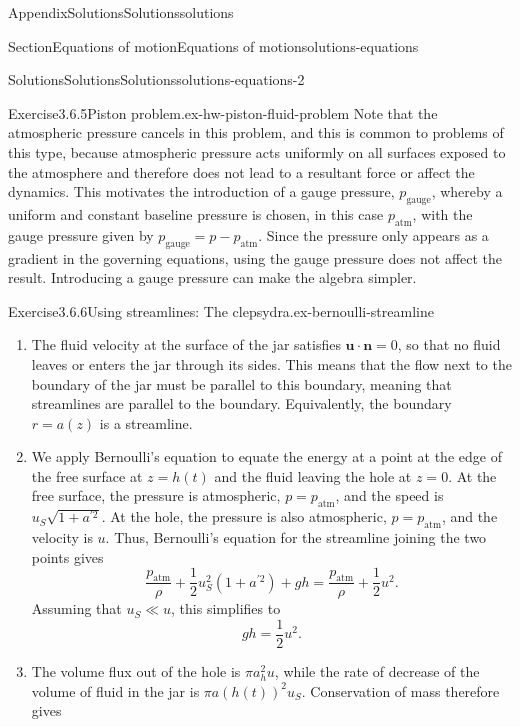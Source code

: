 \documentclass[oneside,10pt,]{book}
\numberwithin{equation}{section}
\newcommand{\bn}{\boldsymbol{n}}
\newcommand{\bu}{\boldsymbol{u}}
\begin{document}
\begin{appendixptx}{Appendix}{Solutions}{}{Solutions}{}{}{solutions}
\begin{sectionptx}{Section}{Equations of motion}{}{Equations of motion}{}{}{solutions-equations}
\begin{solutions-subsection-numberless}{Solutions}{Solutions}{}{Solutions}{}{}{solutions-equations-2}
\begin{divisionsolution}{Exercise}{3.6.5}{Piston problem.}{ex-hw-piston-fluid-problem}
Note that the atmospheric pressure cancels in this problem, and this is common to problems of this type, because atmospheric pressure acts uniformly on all surfaces exposed to the atmosphere and therefore does not lead to a resultant force or affect the dynamics. This motivates the introduction of a gauge pressure, \(p_{\text{gauge}}\), whereby a uniform and constant baseline pressure is chosen, in this case \(p_{\text{atm}}\), with the gauge pressure given by \(p_{\text{gauge}}=p-p_{\text{atm}}\). Since the pressure only appears as a gradient in the governing equations, using the gauge pressure does not affect the result. Introducing a gauge pressure can make the algebra simpler.%
\end{divisionsolution}%
\begin{divisionsolution}{Exercise}{3.6.6}{Using streamlines: The clepsydra.}{ex-bernoulli-streamline}%
\begin{enumerate}[font=\bfseries,label=(\alph*),ref=\alph*]%
\item[(a)]\noindent\hypertarget{ex-bernoulli-streamline-3-2-main}{}The fluid velocity at the surface of the jar satisfies \(\bu\cdot\bn=0\), so that no fluid leaves or enters the jar through its sides. This means that the flow next to the boundary of the jar must be parallel to this boundary, meaning that streamlines are parallel to the boundary. Equivalently, the boundary \(r = a(z)\) is a streamline.%
\item[(b)]\noindent\hypertarget{ex-bernoulli-streamline-4-2-main}{}We apply Bernoulli's equation to equate the energy at a point at the edge of the free surface at \(z = h(t)\) and the fluid leaving the hole at \(z = 0\). At the free surface, the pressure is atmospheric, \(p = p_\text{atm}\), and the speed is \(u_S\sqrt{1+a^{'2}}\). At the hole, the pressure is also atmospheric, \(p = p_\text{atm}\), and the velocity is \(u\). Thus, Bernoulli's equation for the streamline joining the two points gives%
\begin{equation*}
\frac{p_\text{atm}}{\rho} + \frac12 u_S^2(1+a^{'2}) + gh = \frac{p_\text{atm}}{\rho} + \frac12
u^2.
\end{equation*}
Assuming that \(u_S \ll u\), this simplifies to%
\begin{equation*}
gh = \frac12 u^2.
\end{equation*}
%
\item[(c)]\noindent\hypertarget{ex-bernoulli-streamline-5-2-main}{}The volume flux out of the hole is \(\pi a_h^2 u\), while the rate of decrease of the volume of fluid in the jar is \(\pi a(h(t))^2 u_S\). Conservation of mass therefore gives%

\end{enumerate}
\end{divisionsolution}
\end{solutions-subsection-numberless}
\end{sectionptx}
\end{appendixptx}
\end{document}
